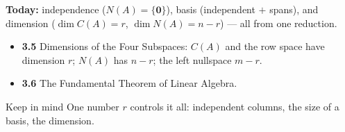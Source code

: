 \documentclass[aspectratio=169, 11pt]{beamer}
\newcommand{\zero}{\mathbf{0}}
\begin{document}
\begin{frame}[t, plain]
  \textbf{Today:} independence ($N(A)=\{\zero\}$), basis (independent $+$ spans), and dimension
  ($\dim C(A)=r$, $\dim N(A)=n-r$) --- all from one reduction.\\[8pt]
  \begin{itemize}
    \setlength{\itemsep}{4pt}
    \item \textbf{3.5} Dimensions of the Four Subspaces: $C(A)$ and the row space have dimension $r$; $N(A)$ has $n-r$; the left nullspace $m-r$.
    \item \textbf{3.6} The Fundamental Theorem of Linear Algebra.
  \end{itemize}
  \vspace{4pt}
  \begin{block}{Keep in mind}
    One number $r$ controls it all: independent columns, the size of a basis, the dimension.
  \end{block}
\end{frame}
\end{document}
